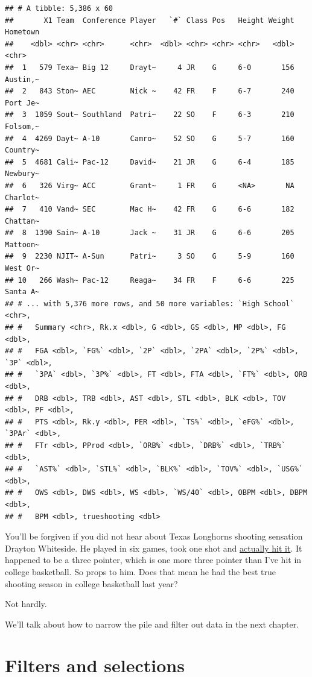 \documentclass[
]{book}
\begin{document}
\begin{verbatim}
## # A tibble: 5,386 x 60
##       X1 Team  Conference Player   `#` Class Pos   Height Weight Hometown
##    <dbl> <chr> <chr>      <chr>  <dbl> <chr> <chr> <chr>   <dbl> <chr>   
##  1   579 Texa~ Big 12     Drayt~     4 JR    G     6-0       156 Austin,~
##  2   843 Ston~ AEC        Nick ~    42 FR    F     6-7       240 Port Je~
##  3  1059 Sout~ Southland  Patri~    22 SO    F     6-3       210 Folsom,~
##  4  4269 Dayt~ A-10       Camro~    52 SO    G     5-7       160 Country~
##  5  4681 Cali~ Pac-12     David~    21 JR    G     6-4       185 Newbury~
##  6   326 Virg~ ACC        Grant~     1 FR    G     <NA>       NA Charlot~
##  7   410 Vand~ SEC        Mac H~    42 FR    G     6-6       182 Chattan~
##  8  1390 Sain~ A-10       Jack ~    31 JR    G     6-6       205 Mattoon~
##  9  2230 NJIT~ A-Sun      Patri~     3 SO    G     5-9       160 West Or~
## 10   266 Wash~ Pac-12     Reaga~    34 FR    F     6-6       225 Santa A~
## # ... with 5,376 more rows, and 50 more variables: `High School` <chr>,
## #   Summary <chr>, Rk.x <dbl>, G <dbl>, GS <dbl>, MP <dbl>, FG <dbl>,
## #   FGA <dbl>, `FG%` <dbl>, `2P` <dbl>, `2PA` <dbl>, `2P%` <dbl>, `3P` <dbl>,
## #   `3PA` <dbl>, `3P%` <dbl>, FT <dbl>, FTA <dbl>, `FT%` <dbl>, ORB <dbl>,
## #   DRB <dbl>, TRB <dbl>, AST <dbl>, STL <dbl>, BLK <dbl>, TOV <dbl>, PF <dbl>,
## #   PTS <dbl>, Rk.y <dbl>, PER <dbl>, `TS%` <dbl>, `eFG%` <dbl>, `3PAr` <dbl>,
## #   FTr <dbl>, PProd <dbl>, `ORB%` <dbl>, `DRB%` <dbl>, `TRB%` <dbl>,
## #   `AST%` <dbl>, `STL%` <dbl>, `BLK%` <dbl>, `TOV%` <dbl>, `USG%` <dbl>,
## #   OWS <dbl>, DWS <dbl>, WS <dbl>, `WS/40` <dbl>, OBPM <dbl>, DBPM <dbl>,
## #   BPM <dbl>, trueshooting <dbl>
\end{verbatim}

You'll be forgiven if you did not hear about Texas Longhorns shooting sensation Drayton Whiteside. He played in six games, took one shot and \href{https://youtu.be/QNviQf9X4rM?t=186}{actually hit it}. It happened to be a three pointer, which is one more three pointer than I've hit in college basketball. So props to him. Does that mean he had the best true shooting season in college basketball last year?

Not hardly.

We'll talk about how to narrow the pile and filter out data in the next chapter.

\hypertarget{filters-and-selections}{%
\chapter{Filters and selections}\label{filters-and-selections}}
\end{document}

